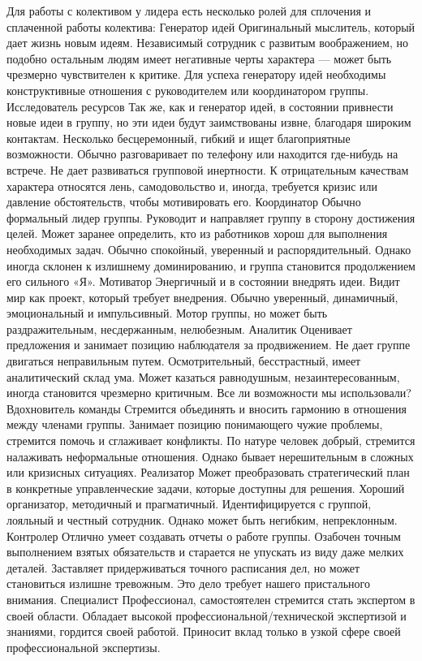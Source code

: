 \documentclass{../industrial-development}
\begin{document}
Для работы с колективом у лидера есть несколько ролей для сплочения и сплаченной работы колектива:
Генератор идей
Оригинальный мыслитель, который дает жизнь новым идеям. Независимый сотрудник с развитым воображением, но подобно остальным людям имеет негативные черты характера — может быть чрезмерно чувствителен к критике. Для успеха генератору идей необходимы конструктивные отношения с руководителем или координатором группы.
Исследователь ресурсов
Так же, как и генератор идей, в состоянии привнести новые идеи в группу, но эти идеи будут заимствованы извне, благодаря широким контактам. Несколько бесцеремонный, гибкий и ищет благоприятные возможности. Обычно разговаривает по телефону или находится где-нибудь на встрече. Не дает развиваться групповой инертности. К отрицательным качествам характера относятся лень, самодовольство и, иногда, требуется кризис или давление обстоятельств, чтобы мотивировать его.
Координатор
Обычно формальный лидер группы. Руководит и направляет группу в сторону достижения целей. Может заранее определить, кто из работников хорош для выполнения необходимых задач. Обычно спокойный, уверенный и распорядительный. Однако иногда склонен к излишнему доминированию, и группа становится продолжением его сильного «Я».
Мотиватор
Энергичный и в состоянии внедрять идеи. Видит мир как проект, который требует внедрения. Обычно уверенный, динамичный, эмоциональный и импульсивный. Мотор группы, но может быть раздражительным, несдержанным, нелюбезным.
Аналитик
Оценивает предложения и занимает позицию наблюдателя за продвижением. Не дает группе двигаться неправильным путем. Осмотрительный, бесстрастный, имеет аналитический склад ума. Может казаться равнодушным, незаинтересованным, иногда становится чрезмерно критичным.	Все ли возможности мы использовали?
Вдохновитель команды
Стремится объединять и вносить гармонию в отношения между членами группы. Занимает позицию понимающего чужие проблемы, стремится помочь и сглаживает конфликты. По натуре человек добрый, стремится налаживать неформальные отношения. Однако бывает нерешительным в сложных или кризисных ситуациях.
Реализатор
Может преобразовать стратегический план в конкретные управленческие задачи, которые доступны для решения. Хороший организатор, методичный и прагматичный. Идентифицируется с группой, лояльный и честный сотрудник. Однако может быть негибким, непреклонным.
Контролер
Отлично умеет создавать отчеты о работе группы. Озабочен точным выполнением взятых обязательств и старается не упускать из виду даже мелких деталей. Заставляет придерживаться точного расписания дел, но может становиться излишне тревожным.	Это дело требует нашего пристального внимания.
Специалист
Профессионал, самостоятелен стремится стать экспертом в своей области. Обладает высокой профессиональной/технической экспертизой и знаниями, гордится своей работой. Приносит вклад только в узкой сфере своей профессиональной экспертизы.
\end{document}
